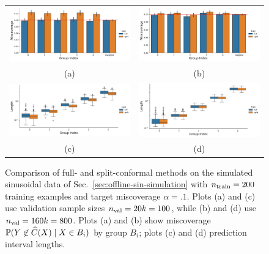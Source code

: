 \documentclass[11pt]{article}
\begin{document}
\begin{figure}
  \begin{center}
    \begin{tabular}{cc}
      \hspace{-.5cm}
      \includegraphics[width=.5\columnwidth]{Images/group_miscoverage_ratio_40}
      &
      \hspace{-.25cm}
      \includegraphics[width=.5\columnwidth]{Images/group_miscoverage_ratio_160} \\
      (a) & (b) \\
      \hspace{-.5cm}
      \includegraphics[width=.5\columnwidth]{Images/group_length_ratio_40} &
      \hspace{-.25cm}
      \includegraphics[width=.5\columnwidth]{Images/group_length_ratio_160} \\
      (c) & (d)
    \end{tabular}
    \caption{
      \label{fig:little-silly-experiment}
      Comparison of full- and split-conformal
      methods on the simulated sinusoidal data of
      Sec.~\ref{sec:offline-sin-simulation} with
      $n_{\textup{train}} = 200$ training examples and target
      miscoverage $\alpha = .1$.
      Plots (a) and (c) use validation
      sample sizes $n_{\textup{val}} = 20 k = 100$,
      while (b) and (d) use
      $n_{\textup{val}} = 160 k = 800$. Plots (a) and
      (b) show miscoverage $\mathbb{P}(Y \not \in \widehat{C}(X) \mid X \in B_i)$ by
      group $B_i$; plots (c) and (d) prediction interval lengths.
    }
  \end{center}
\end{figure}
\end{document}
